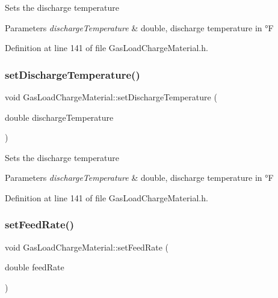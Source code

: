 Sets the discharge temperature 
\begin{DoxyParams}{Parameters}
{\em discharge\+Temperature} & double, discharge temperature in °F \\
\hline
\end{DoxyParams}


Definition at line 141 of file Gas\+Load\+Charge\+Material.\+h.

\mbox{\label{class_gas_load_charge_material_a6c53344d5370a1e9b7321a530a6843c0}} 
\subsubsection{\texorpdfstring{set\+Discharge\+Temperature()}{setDischargeTemperature()}\hspace{0.1cm}{\footnotesize\ttfamily [3/3]}}
{\footnotesize\ttfamily void Gas\+Load\+Charge\+Material\+::set\+Discharge\+Temperature (\begin{DoxyParamCaption}\item[{double}]{discharge\+Temperature }\end{DoxyParamCaption})\hspace{0.3cm}{\ttfamily [inline]}}

Sets the discharge temperature 
\begin{DoxyParams}{Parameters}
{\em discharge\+Temperature} & double, discharge temperature in °F \\
\hline
\end{DoxyParams}


Definition at line 141 of file Gas\+Load\+Charge\+Material.\+h.

\mbox{\label{class_gas_load_charge_material_a922b728dfd109d1c1684d7dfad82ec8e}} 
\subsubsection{\texorpdfstring{set\+Feed\+Rate()}{setFeedRate()}\hspace{0.1cm}{\footnotesize\ttfamily [1/3]}}
{\footnotesize\ttfamily void Gas\+Load\+Charge\+Material\+::set\+Feed\+Rate (\begin{DoxyParamCaption}\item[{double}]{feed\+Rate }\end{DoxyParamCaption})\hspace{0.3cm}{\ttfamily [inline]}}

